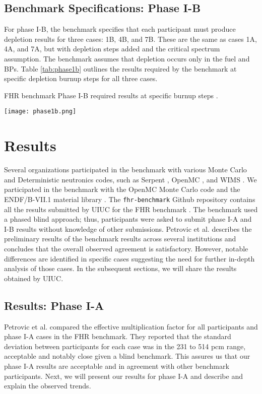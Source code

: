 \subsection{Benchmark Specifications: Phase I-B}
For phase I-B, the benchmark specifies that each participant must produce 
depletion results for three cases: 1B, 4B, and 7B. 
These are the same as cases 1A, 4A, and 7A, but with depletion steps added and
the critical spectrum assumption. 
The benchmark assumes that depletion occurs only in the fuel and \glspl{BP}. 
Table \ref{tab:phase1b} outlines the results required by the benchmark at specific 
depletion burnup steps for all three cases. 

\begin{table}
    \centering
    \caption{\gls{FHR} benchmark Phase I-B required results at specific burnup 
    steps \cite{noauthor_fluoride_nodate}.}
    \label{tab:phase1b}
    \texttt{[image: phase1b.png]}
  \end{table}

\section{Results}
Several organizations participated in the benchmark with various Monte Carlo
and Deterministic neutronics codes, such as Serpent \cite{leppanen_serpent_2014}, 
OpenMC \cite{romano_openmc_2013}, and WIMS \cite{lindley_current_2017}. 
We participated in the benchmark with the OpenMC Monte Carlo code 
\cite{romano_openmc_2013} and the ENDF/B-VII.1 material library 
\cite{chadwick_endf/b-vii.1_2011}.
The \texttt{fhr-benchmark} Github repository contains all the results submitted 
by \gls{UIUC} for the \gls{FHR} benchmark \cite{chee_arfcfhr-benchmark_2021}. 
The benchmark used a phased blind approach; thus, participants were asked to 
submit phase I-A and I-B results without knowledge of other submissions. 
Petrovic et al. \cite{petrovic_preliminary_2021} describes the preliminary 
results of the benchmark results across several institutions and concludes 
that the overall observed agreement is satisfactory. 
However, notable differences are identified in specific cases suggesting the 
need for further in-depth analysis of those cases. 
In the subsequent sections, we will share the results obtained by \gls{UIUC}.  

\subsection{Results: Phase I-A}
Petrovic et al. \cite{petrovic_preliminary_2021} compared the effective 
multiplication factor for all participants and phase I-A cases in the \gls{FHR} 
benchmark. 
They reported that the standard deviation between participants for each case 
was in the 231 to 514 pcm range, acceptable and notably close given a blind 
benchmark.
This assures us that our phase I-A results are acceptable and in agreement 
with other benchmark participants. 
Next, we will present our results for phase I-A and describe and explain the 
observed trends.

